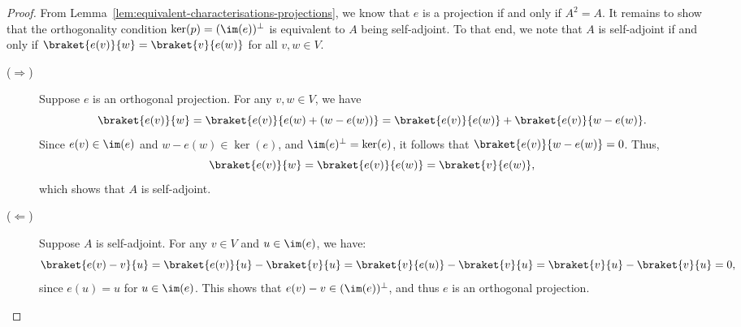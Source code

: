 \documentclass[a4paper,oneside, 12pt]{amsart}
\begin{document}
\begin{proof}
  From Lemma~\ref{lem:equivalent-characterisations-projections}, we know that \( e \) is a projection if and only if \( A^2 = A \).
  It remains to show that the orthogonality condition \( \ker(p) = (\im(e))^\perp \) is equivalent to \( A \) being self-adjoint.
  To that end, we note that \(A\) is self-adjoint if and only if \(\braket{e(v)}{w} = \braket{v}{e(w)}\) for all \(v,w \in V\).

  \begin{description}
    \item[(\( \Rightarrow \))]
    Suppose \( e \) is an orthogonal projection.
    For any \( v, w \in V \), we have
    \begin{equation*}
      \braket{e(v)}{w}
      = \braket{e(v)}{e(w) + (w - e(w))}
      = \braket{e(v)}{e(w)} + \braket{e(v)}{w - e(w)}.
    \end{equation*}
    Since \( e(v) \in \im(e) \) and \( w - e(w) \in \ker(e) \), and \( \im(e)^{\perp} = \ker(e) \), it follows that \( \braket{e(v)}{w - e(w)} = 0 \).
    Thus,
    \begin{equation*}
      \braket{e(v)}{w} = \braket{e(v)}{e(w)} = \braket{v}{e(w)},
    \end{equation*}
    which shows that \( A \) is self-adjoint.

    \item[(\( \Leftarrow \))]
    Suppose \( A \) is self-adjoint.
    For any \( v \in V \) and \( u \in \im(e) \), we have:
    \begin{equation*}
      \braket{e(v) - v}{u}
      = \braket{e(v)}{u} - \braket{v}{u}
      = \braket{v}{e(u)} - \braket{v}{u}
      = \braket{v}{u} - \braket{v}{u}
      = 0,
    \end{equation*}
    since \( e(u) = u \) for \( u \in \im(e) \).
    This shows that \( e(v) - v \in (\im(e))^\perp \), and thus \( e \) is an orthogonal projection. \qedhere
  \end{description}
\end{proof}
\end{document}
